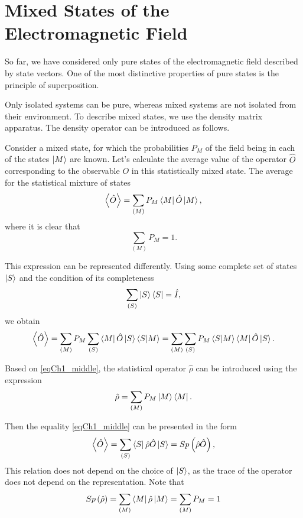 \section{Mixed States of the Electromagnetic Field}
So far, we have considered only pure states of the electromagnetic field described by state vectors. One of the most distinctive properties of pure states is the principle of superposition.

Only isolated systems can be pure, whereas mixed systems are not isolated from their environment. To describe mixed states, we use the density matrix apparatus. The density operator can be introduced as follows.

Consider a mixed state, 
for which the probabilities $P_M$ of the field being in each of the states $\ket{M}$ are known. Let's calculate the average value of the operator $\hat{O}$ corresponding to the observable $O$ in this statistically mixed state. The average for the statistical mixture of states  
\begin{equation}
\left<\hat{O}\right> = \sum_{(M)} P_M\bra{M}\hat{O}\ket{M},
\end{equation}
where it is clear that 
\[
\sum_{(M)} P_M = 1.
\]

This expression can be represented differently. Using some complete set of states $\ket{S}$ and the condition of its completeness 
\[
\sum_{(S)}\ket{S}\bra{S} = \hat{I},
\]
we obtain
\begin{equation}
\left<\hat{O}\right> = \sum_{(M)}
P_M\sum_{(S)}\bra{M}\hat{O}\ket{S}\bra{S}\ket{M}
= \sum_{(M)}\sum_{(S)}P_M\bra{S}\ket{M}\bra{M}\hat{O}\ket{S}.
\label{eqCh1_middle}
\end{equation}

Based on \eqref{eqCh1_middle}, the statistical operator $\hat{\rho}$ can be introduced using the expression
\begin{equation}
\hat{\rho} = \sum_{(M)}
P_M\ket{M}\bra{M}.
\end{equation}

Then the equality \eqref{eqCh1_middle} can be presented in the form
\begin{equation}
\left<\hat{O}\right> = \sum_{(S)}
\bra{S}\hat{\rho}\hat{O}\ket{S} = Sp \left(\hat{\rho}\hat{O}\right),
\end{equation}
This relation does not depend on the choice of $\ket{S}$, as the trace of the operator does not depend on the representation. Note that 
\begin{equation}
Sp \left(\hat{\rho}\right) = \sum_{(M)}
\bra{M}\hat{\rho}\ket{M} = \sum_{(M)} P_M = 1
\label{eqCh1_spequal1}
\end{equation}

